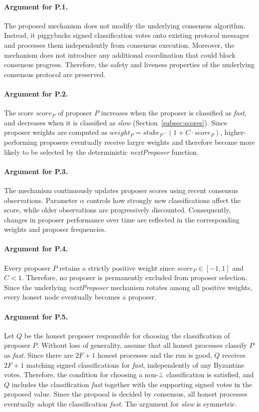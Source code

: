 \paragraph{Argument for P.1.}
The proposed mechanism does not modify the underlying consensus algorithm.
Instead, it piggybacks signed classification votes onto existing protocol messages and processes them independently from consensus execution. 
Moreover, the mechanism does not introduce any additional coordination that could block consensus progress. 
Therefore, the safety and liveness properties of the underlying consensus protocol are preserved.

\paragraph{Argument for P.2.}
The score $score_P$ of proposer $P$ increases when the proposer is classified as \textit{fast}, and decreases when it is classified as \textit{slow} (Section~\ref{subsec:scores}). 
Since proposer weights are computed as $weight_P = stake_P \cdot (1 + C \cdot score_P)$, higher-performing proposers eventually receive larger weights and therefore become more likely to be selected by the deterministic \textit{nextProposer} function.

\paragraph{Argument for P.3.}
The mechanism continuously updates proposer scores using recent consensus observations. 
Parameter $\alpha$ controls how strongly new classifications affect the score, while older observations are progressively discounted. 
Consequently, changes in proposer performance over time are reflected in the corresponding weights and proposer frequencies.

\paragraph{Argument for P.4.}
Every proposer $P$ retains a strictly positive weight since $score_P \in [-1,1]$ and $C < 1$. 
Therefore, no proposer is permanently excluded from proposer selection. 
Since the underlying \textit{nextProposer} mechanism rotates among all positive weights, every honest node eventually becomes a proposer.

\paragraph{Argument for P.5.}
Let $Q$ be the honest proposer responsible for choosing the classification of proposer $P$. 
Without loss of generality, assume that all honest processes classify $P$ as \textit{fast}. 
Since there are $2F+1$ honest processes and the run is good, $Q$ receives $2F+1$ matching signed classifications for \textit{fast}, independently of any Byzantine votes. 
Therefore, the condition for choosing a non-$\bot$ classification is satisfied, and $Q$ includes the classification \textit{fast} together with the supporting signed votes in the proposed value.
Since the proposal is decided by consensus, all honest processes eventually adopt the classification \textit{fast}. The argument for \textit{slow} is symmetric.

